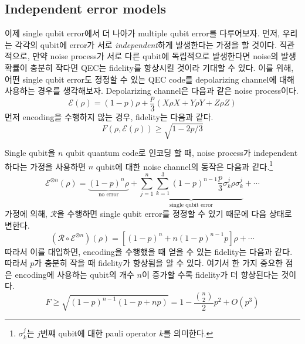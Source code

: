 \subsection{Independent error models}
이제 single qubit error에서 더 나아가 multiple qubit error를 다루어보자. 먼저, 우리는 각각의 qubit에 error가 서로 \textit{independent}하게 발생한다는 가정을 할 것이다. 직관적으로, 만약 noise process가 서로 다른 qubit에 독립적으로 발생한다면 noise의 발생 확률이 충분히 작다면 QEC는 fidelity를 향상시킬 것이라 기대할 수 있다.
이를 위해, 어떤 single qubit error도 정정할 수 있는 QEC code를 depolarizing channel에 대해 사용하는 경우를 생각해보자. Depolarizing channel은 다음과 같은 noise process이다.
\begin{equation*}
    \mathcal E(\rho) = (1-p)\rho + \frac{p}{3} (X \rho X + Y \rho Y + Z \rho Z)
\end{equation*}
먼저 encoding을 수행하지 않는 경우, fidelity는 다음과 같다.
\begin{equation*}
    F(\rho, \mathcal{E}(\rho)) \geq \sqrt{1-2 p / 3}
\end{equation*}

Single qubit을 $n$ qubit quantum code로 인코딩 할 때, noise process가 independent하다는 가정을 사용하면 $n$ qubit에 대한 noise channel의 동작은 다음과 같다.\footnote{$\sigma_{k}^j$는 $j$번쨰 qubit에 대한 pauli operator $k$를 의미한다.}
\begin{equation*}
    \mathcal{E}^{\otimes n}(\rho)=\underbrace{(1-p)^n \rho}_{\text{no error}}+\underbrace{\sum_{j=1}^n \sum_{k=1}^3(1-p)^{n-1} \frac{p}{3} \sigma_k^j \rho \sigma_k^j}_{\text{single qubit error}}+\cdots
\end{equation*}
가정에 의해, $\mathcal R$을 수행하면 single qubit error를 정정할 수 있기 때문에 다음 상태로 변한다.
\begin{equation*}
    \left(\mathcal{R} \circ \mathcal{E}^{\otimes n}\right)(\rho)=\left[(1-p)^n+n(1-p)^{n-1} p\right] \rho+\cdots
\end{equation*}
따라서 이를 대입하면, encoding을 수행했을 때 얻을 수 있는 fidelity는 다음과 같다. 따라서 $p$가 충분히 작을 때 fidelity가 향상됨을 알 수 있다. 여기서 한 가지 중요한 점은 encoding에 사용하는 qubit의 개수 $n$이 증가할 수록 fidelity가 더 향상된다는 것이다. 
\begin{equation*}
    F \geq \sqrt{(1-p)^{n-1}(1-p+n p)}=1-\frac{\binom{n}{2}}{2} p^2+O\left(p^3\right)
\end{equation*}

